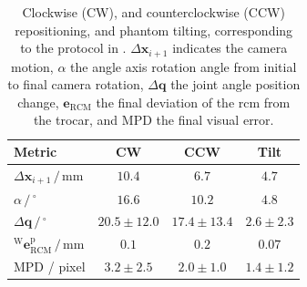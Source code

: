 \begin{table}
\centering
\caption{Clockwise (CW), and counterclockwise (CCW) repositioning, and phantom tilting, corresponding to the protocol in . $\Delta\mathbf{x}_{i+1}$ indicates the camera motion, $\alpha$ the angle axis rotation angle from initial to final camera rotation, $\Delta\mathbf{q}$ the joint angle position change, $\mathbf{e}_\text{RCM}$ the final deviation of the \acrshort{rcm} from the trocar, and MPD the final visual error.}
\begin{tabular}{lccc}
    \toprule
     Metric & CW & CCW & Tilt \\
     \hline
     $\Delta\mathbf{x}_{i+1}\,/\,\text{mm}$ & $10.4$ & $6.7$ & $4.7$ \\
     \hline
     $\alpha\,/\,^\circ$ & $16.6$ & $10.2$ & $4.8$ \\
     \hline
     $\Delta\mathbf{q}\,/\,^\circ$ & $20.5\pm12.0$ & $17.4\pm13.4$ & $2.6 \pm 2.3$ \\
     \hline
     $^\text{W}\mathbf{e}^\text{p}_\text{RCM}\,/\,\text{mm}$& $0.1$ & $0.2$ & $0.07$ \\
     \hline
     MPD / pixel & $3.2\pm2.5$ & $2.0\pm1.0$ & $1.4\pm1.2$ \\
     \bottomrule
\end{tabular}
\label{c2:tab:repositioning}
\end{table}
%    

